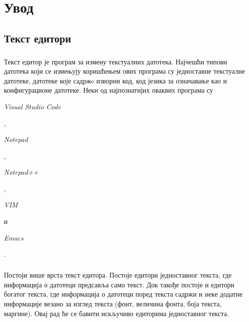\documentclass[12pt,oneside]{memoir}
\begin{document}
\frontmatter
\naslovna
\komisija
\posveta{}
\apstrakt
\tableofcontents*

\mainmatter

\chapter{Увод}

\section{Текст едитори}

\paragraph{}
Текст едитор је програм за измену текстуалних датотека. Најчешћи типови датотека
који се измењују коришћењем ових програма су једноставне текстуалне датотеке, 
датотеке које садржe изворни код, код језика за означавање као и конфигурационе датотеке. 
Неки од најпознатијих оваквих програма су \begin{latinica}\textit{Visual Studio Code}
\end{latinica} \cite{VSC}, \begin{latinica}\textit{Notepad}\end{latinica} \cite{Notepad},
\begin{latinica}\textit{Notepad++}\end{latinica} \cite{Notepad++}, \begin{latinica}\textit{VIM}
\end{latinica} \cite{VIM} и \begin{latinica}\textit{Emacs}\end{latinica} \cite{Emacs}.

\paragraph{}
Постоји више врста текст едитора. Постоје едитори једноставног текста, где информација
о датотеци предсавља само текст. Док такође постоје и едитори богатог текста, где
информација о датотеци поред текста садржи и неке додатне информације везано за изглед
текста (фонт, величина фонта, боја текста, маргине). Овај рад ће се бавити искључиво
едиторима једноставног текста.
\end{document}
